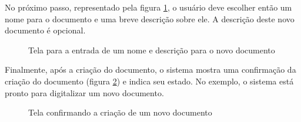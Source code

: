 No próximo passo, representado pela figura \ref{fig:dig_6}, o usuário deve escolher então um nome para o documento e uma breve descrição sobre ele. A descrição deste novo documento é opcional.

\begin{figure}[h]
 \centering
    \setlength\fboxsep{0pt}
    \setlength\fboxrule{0.5pt}
  \caption {Tela para a entrada de um nome e descrição para o novo documento}
  \label{fig:dig_6}
\end{figure}

Finalmente, após a criação do documento, o sistema mostra uma confirmação da criação do documento (figura \ref{fig:dig_7}) e indica seu estado. No exemplo, o sistema está pronto para digitalizar um novo documento.

\begin{figure}[h]
 \centering
    \setlength\fboxsep{0pt}
    \setlength\fboxrule{0.5pt}
  \caption {Tela confirmando a criação de um novo documento}
  \label{fig:dig_7}
\end{figure}

